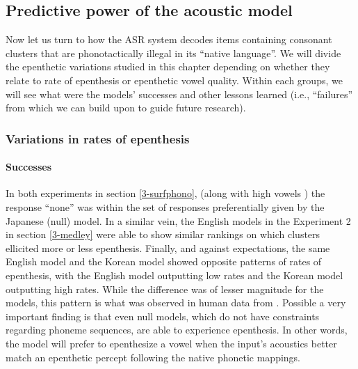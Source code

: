 {%
\subsection{Predictive power of the acoustic model}
Now let us turn to how the ASR system decodes items containing consonant clusters that are phonotactically illegal in its ``native language''. We will divide the epenthetic variations studied in this chapter depending on whether they relate to rate of epenthesis or epenthetic vowel quality. Within each groups, we will see what were the models' successes and other lessons learned (i.e., ``failures'' from which we can build upon to guide future research).   

\subsubsection{Variations in rates of epenthesis}
\paragraph{Successes}
In both experiments in section \ref{3-surfphono}, (along with high vowels ) the response ``none'' was within the set of responses preferentially given by the Japanese (null) model. In a similar vein, the English models in the Experiment 2 in section \ref{3-medley} were able to show similar rankings on which clusters ellicited more or less epenthesis. Finally, and against expectations, the same English model and the Korean model showed opposite patterns of rates of epenthesis, with the English model outputting low rates and the Korean model outputting high rates. While the difference was of lesser magnitude for the models, this pattern is what was observed in human data from \cite{durvasula2015}. Possible a very important finding is that even null models, which do not have constraints regarding phoneme sequences, are able to experience epenthesis. In other words, the model will prefer to epenthesize a vowel when the input's acoustics better match an epenthetic percept following the native phonetic mappings.      

}
